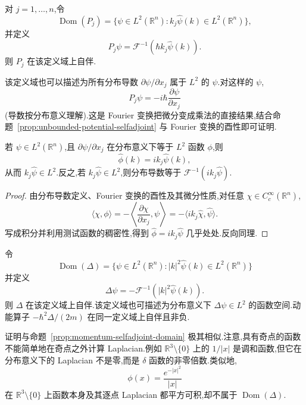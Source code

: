 \begin{proposition}[动量算子的自伴域]\label{prop:momentum-selfadjoint-domain}
对 \(j=1,\ldots,n\),令
\[
\operatorname{Dom}(P_{j})
=\{\psi\in L^{2}(\mathbb{R}^{n}):k_{j}\widehat\psi(k)\in L^{2}(\mathbb{R}^{n})\},
\]
并定义
\[
P_{j}\psi=\mathcal{F}^{-1}(\hbar k_{j}\widehat\psi(k)).
\]
则 \(P_{j}\) 在该定义域上自伴.
\end{proposition}

该定义域也可以描述为所有分布导数 \(\partial\psi/\partial x_{j}\) 属于 \(L^{2}\) 的 \(\psi\).对这样的 \(\psi\),
\[
P_{j}\psi=-i\hbar\frac{\partial\psi}{\partial x_{j}}
\]
(导数按分布意义理解).这是 Fourier 变换把微分变成乘法的直接结果,结合命题~\ref{prop:unbounded-potential-selfadjoint} 与 Fourier 变换的酉性即可证明.

\begin{lemma}\label{lem:fourier-distribution-derivative}
若 \(\psi\in L^{2}(\mathbb{R}^{n})\),且 \(\partial\psi/\partial x_{j}\) 在分布意义下等于 \(L^{2}\) 函数 \(\phi\),则
\[
\widehat\phi(k)=ik_{j}\widehat\psi(k),
\]
从而 \(k_{j}\widehat\psi\in L^{2}\).反之,若 \(k_{j}\widehat\psi\in L^{2}\),则分布导数等于 \(\mathcal{F}^{-1}(ik_{j}\widehat\psi)\).
\end{lemma}

\begin{proof}
由分布导数定义、Fourier 变换的酉性及其微分性质,对任意 \(\chi\in C_{c}^{\infty}(\mathbb{R}^{n})\),
\[
\langle\chi,\phi\rangle
=-\left\langle\frac{\partial\chi}{\partial x_{j}},\psi\right\rangle
=-\langle ik_{j}\widehat\chi,\widehat\psi\rangle.
\]
写成积分并利用测试函数的稠密性,得到 \(\widehat\phi=ik_{j}\widehat\psi\) 几乎处处.反向同理.
\end{proof}

\begin{proposition}\label{prop:laplacian-selfadjoint}
令
\[
\operatorname{Dom}(\Delta)=\{\psi\in L^{2}(\mathbb{R}^{n}):|k|^{2}\widehat\psi(k)\in L^{2}(\mathbb{R}^{n})\}
\]
并定义
\[
\Delta\psi=-\mathcal{F}^{-1}(|k|^{2}\widehat\psi(k)).
\label{eq:laplacian-fourier-domain}
\]
则 \(\Delta\) 在该定义域上自伴.该定义域也可描述为分布意义下 \(\Delta\psi\in L^{2}\) 的函数空间.动能算子 \(-\hbar^{2}\Delta/(2m)\) 在同一定义域上自伴且非负.
\end{proposition}

证明与命题~\ref{prop:momentum-selfadjoint-domain} 极其相似.注意,具有奇点的函数不能简单地在奇点之外计算 Laplacian.例如 \(\mathbb{R}^{3}\setminus\{0\}\) 上的 \(1/|x|\) 是调和函数,但它在分布意义下的 Laplacian 不是零,而是 \(\delta\) 函数的非零倍数.类似地,
\[
\phi(x)=\frac{e^{-|x|^{2}}}{|x|}
\]
在 \(\mathbb{R}^{3}\setminus\{0\}\) 上函数本身及其逐点 Laplacian 都平方可积,却不属于 \(\operatorname{Dom}(\Delta)\).

